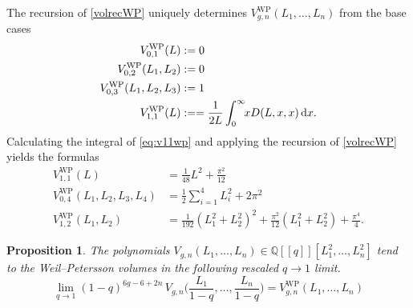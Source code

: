 \documentclass[a4paper]{article}
\theoremstyle{plain}
\newtheorem{proposition}[theorem]{Proposition}
\theoremstyle{definition}
\newcommand{\dd}{\mathrm{d}}
\newcommand{\bq}{\mathbb{Q}}
\begin{document}
The recursion of \cref{volrecWP} uniquely determines $V_{g,n}^{\mathrm{WP}}(L_1, \ldots, L_n)$ from the base cases
\begin{align}
V^{\mathrm{WP}}_{0,1}(L) &:= 0 \notag \\
V^{\mathrm{WP}}_{0,2}(L_1, L_2) &:= 0 \notag \\
V^{\mathrm{WP}}_{0,3}(L_1,L_2,L_3) &:= 1 \notag \\
V^{\mathrm{WP}}_{1,1}(L) &:= = \frac{1}{2L} \int_0^\infty \!\! xD(L,x,x) \, \dd x. \label{eq:v11wp}
\end{align}
Calculating the integral of \cref{eq:v11wp} and applying the recursion of \cref{volrecWP} yields the formulas
\begin{align*}
V^{\mathrm{WP}}_{1,1}(L) &= \frac{1}{48}L^2+ \frac{\pi^2}{12} \\
V^{\mathrm{WP}}_{0,4} (L_1, L_2, L_3, L_4) &= \frac{1}{2} \sum_{i=1}^4 L_i^2 + 2\pi^2 \\
V^{\mathrm{WP}}_{1,2}(L_1, L_2) &= \frac{1}{192} (L_1^2+L_2^2)^2 + \frac{\pi^2}{12} (L_1^2+L_2^2) + \frac{\pi^4}{4}.
\end{align*}


\begin{proposition} \label{limit}
The polynomials $V_{g,n}(L_1, \ldots, L_n) \in\bq[[q]][L_1^2, \ldots, L_n^2]$ tend to the Weil--Petersson volumes in the following rescaled $q \to 1$ limit.
\[
\lim_{q\to 1} (1-q)^{6g-6+2n} \, V_{g,n} \Big( \frac{L_1}{1-q}, \ldots, \frac{L_n}{1-q} \Big) = V^{\mathrm{WP}}_{g,n}(L_1, \ldots, L_n)
\]
\end{proposition}
\end{document}
